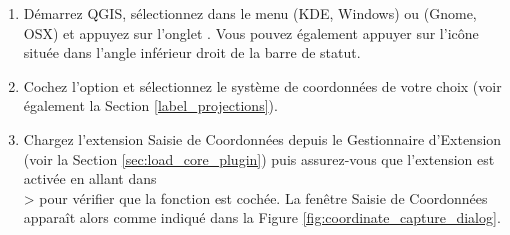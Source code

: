 \begin{enumerate}
  \item Démarrez QGIS, sélectionnez  dans le menu  (KDE, Windows) ou  (Gnome, OSX) et appuyez sur l'onglet . Vous pouvez également appuyer sur l'icône  située dans l'angle inférieur droit de la barre de statut.
  \item Cochez l'option  et sélectionnez le système de coordonnées de votre choix (voir également la Section \ref{label_projections}).
  \item Chargez l'extension Saisie de Coordonnées depuis le Gestionnaire d'Extension (voir la Section \ref{sec:load_core_plugin}) puis assurez-vous que l'extension est activée en allant dans\\  >  pour vérifier que la fonction  est cochée. La fenêtre Saisie de Coordonnées apparaît alors comme indiqué dans la Figure \ref{fig:coordinate_capture_dialog}.

\end{enumerate}
